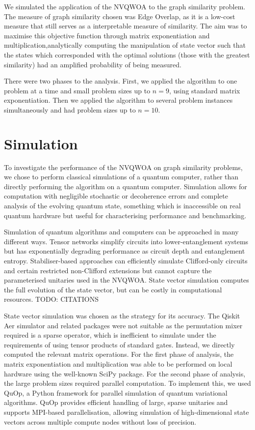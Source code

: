 We simulated the application of the NVQWOA to the graph similarity problem. The measure of graph similarity chosen was Edge Overlap, as it is a low-cost measure that still serves as a interpretable measure of similarity. The aim was to maximise this objective function through matrix exponentiation and multiplication,analytically computing the manipulation of state vector such that the states which corresponded with the optimal solutions (those with the greatest similarity) had an amplified probability of being measured.

There were two phases to the analysis. First, we applied the algorithm to one problem at a time and small problem sizes up to $n=9$, using standard matrix exponentiation. Then we applied the algorithm to several problem instances simultaneously and had problem sizes up to $n=10$.

\section{Simulation}

To investigate the performance of the NVQWOA on graph similarity problems, we chose to perform classical simulations of a quantum computer, rather than directly performing the algorithm on a quantum computer. Simulation allows for computation with negligible stochastic or decoherence errors and complete analysis of the evolving quantum state, something which is inaccessible on real quantum hardware but useful for characterising performance and benchmarking.

Simulation of quantum algorithms and computers can be approached in many different ways. Tensor networks simplify circuits into lower-entanglement systems but has exponentially degrading performance as circuit depth and entanglement entropy. Stabiliser-based approaches can efficiently simulate Clifford-only circuits and certain restricted non-Clifford extensions but cannot capture the parameterised unitaries used in the NVQWOA. State vector simulation computes the full evolution of the state vector, but can be costly in computational resources. TODO: CITATIONS

State vector simulation was chosen as the strategy for its accuracy. The Qiskit Aer simulator and related packages were not suitable as the permutation mixer required is a sparse operator, which is inefficient to simulate under the requirements of using tensor products of standard gates. Instead, we directly computed the relevant matrix operations. For the first phase of analysis, the matrix exponentiation and multiplication was able to be performed on local hardware using the well-known SciPy package. For the second phase of analysis, the large problem sizes required parallel computation. To implement this, we used QuOp, a Python framework for parallel simulation of quantum variational algorithms\cite{QuOp_MPI_paper_variational,QuOp_MPI}. QuOp provides efficient handling of large, sparse unitaries and supports MPI-based parallelisation, allowing simulation of high-dimensional state vectors across multiple compute nodes without loss of precision.

